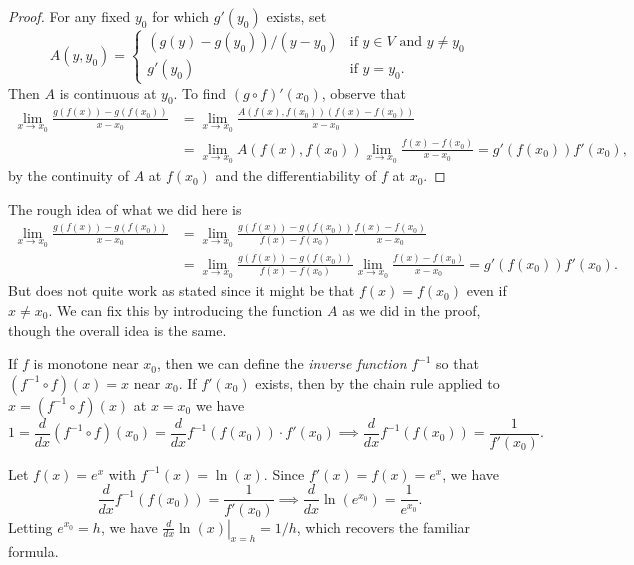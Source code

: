 \begin{proof}
  For any fixed $y_0$ for which $g'(y_0)$ exists,
  set
  \[
    A(y, y_0) =
    \begin{cases}
      (g(y) - g(y_0)) / (y - y_0) & \text{if } y \in V \text{ and } y \ne y_0 \\
      g'(y_0) & \text{if } y = y_0.
    \end{cases}
  \]
  Then $A$ is continuous at $y_0$. To find
  $(g \circ f)'(x_0)$, observe that
  \begin{align*}
    \lim_{x \to x_0} \frac{g(f(x)) - g(f(x_0))}{x - x_0}
    &= \lim_{x \to x_0} \frac{A(f(x), f(x_0))(f(x) - f(x_0))}{x - x_0} \\
    &= \lim_{x \to x_0} A(f(x), f(x_0)) \lim_{x \to x_0}\frac{f(x) - f(x_0)}{x - x_0}
    = g'(f(x_0)) f'(x_0),
  \end{align*}
  by the continuity of $A$ at $f(x_0)$ and the
  differentiability of $f$ at $x_0$.
\end{proof}

\begin{remark}
  The rough idea of what we did here is
  \begin{align*}
    \lim_{x \to x_0} \frac{g(f(x)) - g(f(x_0))}{x - x_0}
    &= \lim_{x \to x_0} \frac{g(f(x)) - g(f(x_0))}{f(x) - f(x_0)} \frac{f(x) - f(x_0)}{x - x_0} \\
    &= \lim_{x \to x_0} \frac{g(f(x)) - g(f(x_0))}{f(x) - f(x_0)} \lim_{x \to x_0} \frac{f(x) - f(x_0)}{x - x_0}
    = g'(f(x_0)) f'(x_0).
  \end{align*}
  But does not quite work as stated since
  it might be that $f(x) = f(x_0)$ even if $x \ne x_0$.
  We can fix this by introducing the function $A$
  as we did in the proof, though the overall idea is
  the same.
\end{remark}

\begin{remark}
  If $f$ is monotone near $x_0$, then we can define
  the \emph{inverse function} $f^{-1}$ so that
  $(f^{-1} \circ f)(x) = x$ near $x_0$. If
  $f'(x_0)$ exists, then by the chain rule
  applied to $x = (f^{-1} \circ f)(x)$ at $x = x_0$
  we have
  \[
    1 = \frac{d}{dx}(f^{-1} \circ f)(x_0)
    = \frac{d}{dx} f^{-1}(f(x_0)) \cdot f'(x_0)
    \implies \frac{d}{dx} f^{-1}(f(x_0)) = \frac{1}{f'(x_0)}.
  \]
\end{remark}

\begin{example}
  Let $f(x) = e^x$ with $f^{-1}(x) = \ln(x)$. Since
  $f'(x) = f(x) = e^x$, we have
  \[\frac{d}{dx} f^{-1}(f(x_0)) = \frac{1}{f'(x_0)} \implies
    \frac{d}{dx} \ln(e^{x_0}) = \frac{1}{e^{x_0}}.
  \]
  Letting $e^{x_0} = h$, we have
  $\left.\frac{d}{dx} \ln(x)\right|_{x = h} = 1 / h$,
  which recovers the familiar formula.
\end{example}

